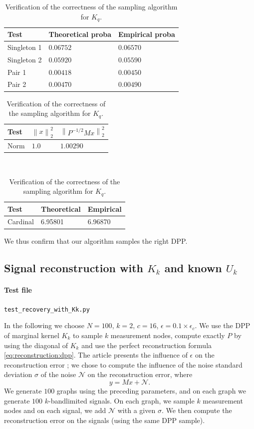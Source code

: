\documentclass{article}
\newcommand{\norm}[1]{\left\|#1\right\|}
\begin{document}
\begin{table}[th]
  \caption{Verification of the correctness of the sampling algorithm for $K_q$.}
  \label{tab:Kq:verification}
  \centering
  \begin{tabular}{lll}
    \toprule
    Test &  Theoretical proba & Empirical proba \\
    \midrule
    Singleton 1 & $0.06752$ & $0.06570$ \\
    Singleton 2 & $0.05920$ & $0.05590$ \\
    Pair 1 & $0.00418$ & $0.00450$ \\
		Pair 2 & $0.00470$ & $0.00490$ \\
    \bottomrule
  \end{tabular}
	\quad
	\begin{tabular}{lll}
    \toprule
    Test &  $\norm{x}_2^2$ & $\norm{P^{-1/2} M x}_2^2$ \\
    \midrule
    Norm & $1.0$ & $1.00290$ \\
    \bottomrule
  \end{tabular} \\
	\vspace{0.5cm}
	\begin{tabular}{lll}
    \toprule
    Test &  Theoretical & Empirical \\
    \midrule
    Cardinal & 6.95801 & 6.96870 \\
    \bottomrule
  \end{tabular}
\end{table}
		

We thus confirm that our algorithm samples the right DPP.

\subsection[Signal reconstruction with Kk qnd known Uk]{Signal reconstruction with $K_k$ and known $U_k$}


\paragraph{Test file} \verb#test_recovery_with_Kk.py#


In the following we choose $N=100$, $k=2$, $c=16$, $\epsilon = 0.1 \times \epsilon_c$. We use the DPP of marginal kernel $K_k$ to sample $k$ measurement nodes, compute exactly $P$ by using the diagonal of $K_k$ and use the perfect reconstruction formula \eqref{eq:reconstruction:dpp}. The article presents the influence of $\epsilon$ on the reconstruction error ; we chose to compute the influence of the noise standard deviation $\sigma$ of the noise $\mathcal{N}$ on the reconstruction error, where
\[ y = Mx + \mathcal{N}. \] 
We generate $100$ graphs using the preceding parameters, and on each graph we generate $100$ $k$-bandlimited signals. On each graph, we sample $k$ measurement nodes and on each signal, we add $\mathcal{N}$ with a given $\sigma$. We then compute the reconstruction error on the signals (using the same DPP sample).
\end{document}
